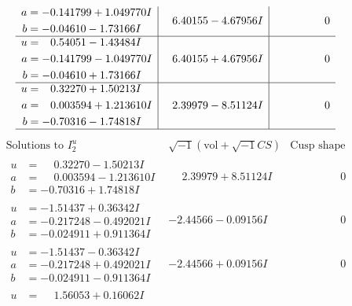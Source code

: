 \documentclass[1p]{elsarticle_modified}
\theoremstyle{definition}
\newcommand{\I}{\sqrt{-1}}
\begin{document}
$$\begin{array}{c|c|c}
\begin{aligned}
a &= -0.141799 + 1.049770 I \\
b &= -0.04610 - 1.73166 I\end{aligned}
 & \phantom{-}6.40155 - 4.67956 I & \phantom{-0.000000 } 0 \\ \hline\begin{aligned}
u &= \phantom{-}0.54051 - 1.43484 I \\
a &= -0.141799 - 1.049770 I \\
b &= -0.04610 + 1.73166 I\end{aligned}
 & \phantom{-}6.40155 + 4.67956 I & \phantom{-0.000000 } 0 \\ \hline\begin{aligned}
u &= \phantom{-}0.32270 + 1.50213 I \\
a &= \phantom{-}0.003594 + 1.213610 I \\
b &= -0.70316 - 1.74818 I\end{aligned}
 & \phantom{-}2.39979 - 8.51124 I & \phantom{-0.000000 } 0\\
 \hline 
 \end{array}$$\newpage$$\begin{array}{c|c|c}  
\text{Solutions to }I^u_{2}& \I (\text{vol} + \sqrt{-1}CS) & \text{Cusp shape}\\
 \hline 
\begin{aligned}
u &= \phantom{-}0.32270 - 1.50213 I \\
a &= \phantom{-}0.003594 - 1.213610 I \\
b &= -0.70316 + 1.74818 I\end{aligned}
 & \phantom{-}2.39979 + 8.51124 I & \phantom{-0.000000 } 0 \\ \hline\begin{aligned}
u &= -1.51437 + 0.36342 I \\
a &= -0.217248 - 0.492021 I \\
b &= -0.024911 + 0.911364 I\end{aligned}
 & -2.44566 - 0.09156 I & \phantom{-0.000000 } 0 \\ \hline\begin{aligned}
u &= -1.51437 - 0.36342 I \\
a &= -0.217248 + 0.492021 I \\
b &= -0.024911 - 0.911364 I\end{aligned}
 & -2.44566 + 0.09156 I & \phantom{-0.000000 } 0 \\ \hline\begin{aligned}
u &= \phantom{-}1.56053 + 0.16062 I \\

\end{aligned}
\end{array}$$
\end{document}
